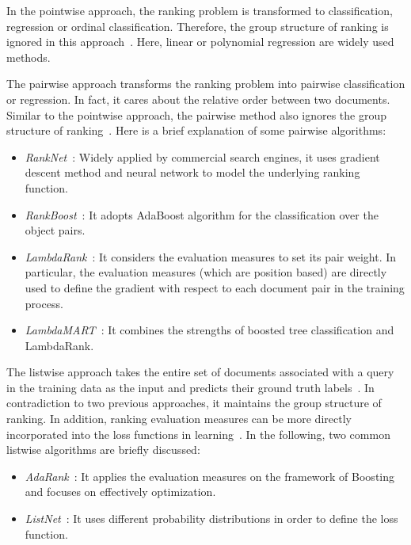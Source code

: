 In the pointwise approach, the ranking problem is transformed to classification, regression or ordinal classification. Therefore, the group structure of ranking is ignored in this approach~\cite{l2r-intro}. Here, linear or polynomial regression are widely used methods.

The pairwise approach transforms the ranking problem into pairwise classification or regression. In fact, it cares about the relative order between two documents. Similar to the pointwise approach, the pairwise method also ignores the group structure of ranking~\cite{l2r-intro}. Here is a brief explanation of some pairwise algorithms:

\begin{itemize}
\vspace{-0.2cm}
\item \textit{RankNet}~\cite{l2r-ranknet}: Widely applied by commercial search engines, it uses gradient descent method and neural network to model the underlying ranking function.
\item \textit{RankBoost}~\cite{l2r-rankboost}: It adopts AdaBoost algorithm for the classification over the object pairs.
\item \textit{LambdaRank}~\cite{l2r-lambdarank}: It considers the evaluation measures to set its pair weight. In particular, the evaluation measures (which are position based) are directly used to define the gradient with respect to each document pair in the training process.
\item \textit{LambdaMART}~\cite{l2r-lambdamart}: It combines the strengths of boosted tree classification and LambdaRank.
\vspace{-0.2cm}
\end{itemize}

The listwise approach takes the entire set of documents associated with a query in the training data as the input and predicts their ground truth labels~\cite{l2r-book}. In contradiction to two previous approaches, it maintains the group structure of ranking. In addition, ranking evaluation measures can be more directly incorporated into the loss functions in learning~\cite{l2r-intro}. In the following, two common listwise algorithms are briefly discussed:

\begin{itemize}
\vspace{-0.2cm}
\item \textit{AdaRank}~\cite{l2r-adarank}: It applies the evaluation measures on the framework of Boosting and focuses on effectively optimization.
\item \textit{ListNet}~\cite{l2r-listnet}: It uses different probability distributions in order to define the loss function.
\vspace{-0.2cm}
\end{itemize}

